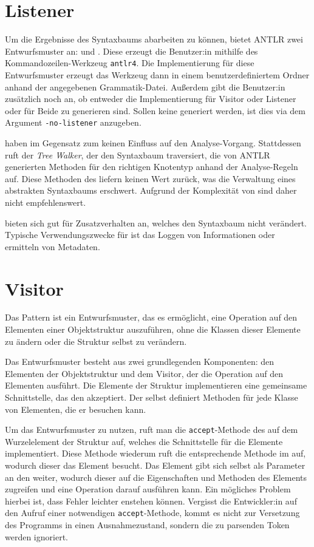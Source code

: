 \section{Listener}

Um die Ergebnisse des Syntaxbaums abarbeiten zu können, bietet ANTLR zwei Entwurfsmuster an: \visitor und \listener. Diese erzeugt die Benutzer:in mithilfe des Kommandozeilen-Werkzeug \texttt{antlr4}. Die Implementierung für diese Entwurfsmuster erzeugt das Werkzeug dann in einem benutzerdefiniertem Ordner anhand der angegebenen Grammatik-Datei. Außerdem gibt die Benutzer:in zusätzlich noch an, ob entweder die Implementierung für Visitor oder Listener oder für Beide zu generieren sind. Sollen keine \listener generiert werden, ist dies via dem Argument \texttt{-no-listener} anzugeben.

\listener haben im Gegensatz zum \visitor keinen Einfluss auf den Analyse-Vorgang. Stattdessen ruft der \textit{Tree Walker}, der den Syntaxbaum traversiert, die von ANTLR generierten Methoden für den richtigen Knotentyp anhand der Analyse-Regeln auf. Diese Methoden des \listeners liefern keinen Wert zurück, was die Verwaltung eines abstrakten Syntaxbaums erschwert. Aufgrund der Komplexität von \toya sind \listener daher nicht empfehlenswert.

\listener bieten sich gut für Zusatzverhalten an, welches den Syntaxbaum nicht verändert. Typische Verwendungszwecke für \listener ist das Loggen von Informationen oder ermitteln von Metadaten.

\section{Visitor}

Das \visitor Pattern ist ein Entwurfsmuster, das es ermöglicht, eine Operation auf den Elementen einer Objektstruktur auszuführen, ohne die Klassen dieser Elemente zu ändern oder die Struktur selbst zu verändern.

Das Entwurfsmuster besteht aus zwei grundlegenden Komponenten: den Elementen der Objektstruktur und dem Visitor, der die Operation auf den Elementen ausführt. Die Elemente der Struktur implementieren eine gemeinsame Schnittstelle, das den \visitor akzeptiert. Der \visitor selbst definiert Methoden für jede Klasse von Elementen, die er besuchen kann.

Um das Entwurfsmuster zu nutzen, ruft man die \texttt{accept}-Methode des \visitors auf dem Wurzelelement der Struktur auf, welches die Schnittstelle für die Elemente implementiert. Diese Methode wiederum ruft die entsprechende Methode im \visitor auf, wodurch dieser das Element besucht. Das Element gibt sich selbst als Parameter an den \visitor weiter, wodurch dieser auf die Eigenschaften und Methoden des Elements zugreifen und eine Operation darauf ausführen kann. Ein mögliches Problem hierbei ist, dass Fehler leichter enstehen können. Vergisst die Entwickler:in auf den Aufruf einer notwendigen \texttt{accept}-Methode, kommt es nicht zur Versetzung des Programms in einen Ausnahmezustand, sondern die zu parsenden Token werden ignoriert.

